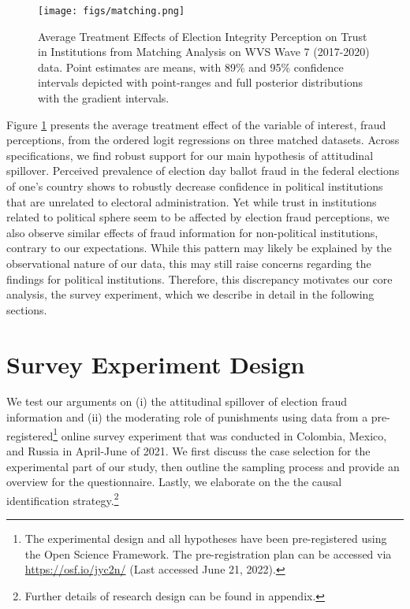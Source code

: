 \documentclass[11pt, ngerman,english,a4]{article}
\begin{document}
\begin{figure}[t]
	\centering
	\texttt{[image: figs/matching.png]}\\
	\caption{Average Treatment Effects of Election Integrity Perception on Trust in Institutions from Matching Analysis on WVS Wave 7 (2017-2020) data. Point estimates are means, with 89\% and 95\% confidence intervals depicted with point-ranges and full posterior distributions with the gradient intervals.} 
	\label{fig:matching}
\end{figure}

Figure \ref{fig:matching} presents the average treatment effect of the variable of interest, fraud perceptions, from the ordered logit regressions on three matched datasets. Across specifications, we find robust support for our main hypothesis of attitudinal spillover. Perceived prevalence of election day ballot fraud in the federal elections of one's country shows to robustly decrease confidence in political institutions that are unrelated to electoral administration. Yet while trust in institutions related to political sphere seem to be affected by election fraud perceptions, we also observe similar effects of fraud information for non-political institutions, contrary to our expectations. While this pattern may likely be explained by the observational nature of our data, this may still raise concerns regarding the findings for political institutions. Therefore, this discrepancy motivates our core analysis, the survey experiment, which we describe in detail in the following sections. 



\newpage
\section*{Survey Experiment Design}

 
We test our arguments on (i) the attitudinal spillover of election fraud information and (ii) the moderating role of punishments using data from a pre-registered\footnote{The experimental design and all hypotheses have been pre-registered using the Open Science Framework. The pre-registration plan can be accessed via \url{https://osf.io/jyc2n/} (Last accessed June 21, 2022).} online survey experiment that was conducted in Colombia, Mexico, and Russia in April-June of 2021. We first discuss the case selection for the experimental part of our study, then outline the sampling process and provide an overview for the questionnaire. Lastly, we elaborate on the the causal identification strategy.\footnote{Further details of research design can be found in appendix.}
\end{document}
